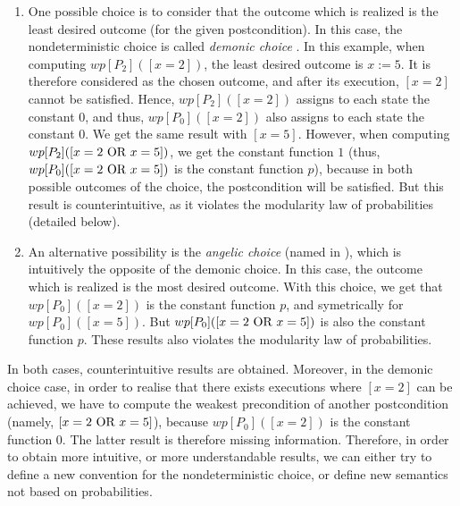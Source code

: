 \documentclass[a4paper,10pt]{llncs}
\newcommand\notsure[1]{{\color{temp} #1}}
\begin{document}
\begin{enumerate}
\item One possible choice is to consider that the outcome which is realized is the least desired outcome (for the given postcondition). In this case, the nondeterministic choice is called \emph{demonic choice} \cite{McIver05}. In this example, when computing $wp[P_2]([x = 2])$, the least desired outcome is $x := 5$. It is therefore considered as the chosen outcome, and after its execution, $[x = 2]$ cannot be satisfied. Hence, $wp[P_2]([x = 2])$ assigns to each state the constant $0$, and thus, $wp[P_0]([x = 2])$ also assigns to each state the constant $0$. We get the same result with $[x = 5]$. However, when computing $wp[P_2]([x = 2 \textnormal{ OR } x = 5])$, we get the constant function $1$ (thus, $wp[P_0]([x = 2 \textnormal{ OR } x = 5])$ is the constant function $p$), because in both possible outcomes of the choice, the postcondition will be satisfied. But this result is counterintuitive, as it violates the modularity law of probabilities (detailed below).
\item An alternative possibility is the \emph{angelic choice} (named in \cite{McIver05}), which is intuitively the opposite of the demonic choice. In this case, the outcome which is realized is the most desired outcome. With this choice, we get that $wp[P_0]([x = 2])$ is the constant function $p$, and symetrically for $wp[P_0]([x = 5])$. But $wp[P_0]([x = 2 \textnormal{ OR } x = 5])$ is also the constant function $p$. These results also violates the modularity law of probabilities.
\end{enumerate}
In both cases, counterintuitive results are obtained.
\notsure{Moreover, in the demonic choice case, in order to realise that there exists executions where $[x=2]$ can be achieved, we have to compute the weakest precondition of another postcondition (namely, $[x = 2 \textnormal{ OR } x = 5]$), because $wp[P_0]([x = 2])$ is the constant function $0$. The latter result is therefore missing information.} Therefore, in order to obtain more intuitive, or more understandable results, we can either try to define a new convention for the nondeterministic choice, or define new semantics not based on probabilities.\bigskip
\end{document}
